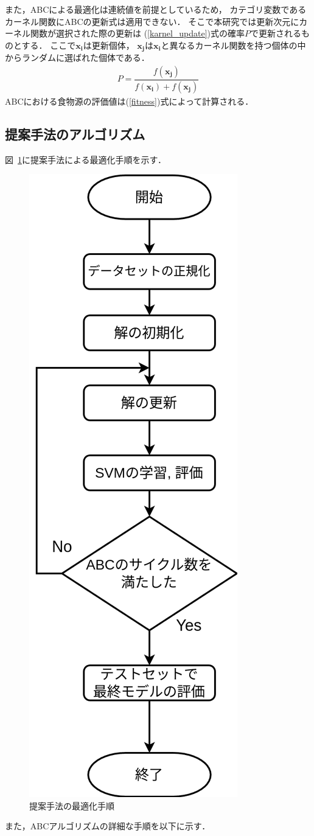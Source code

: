また，ABCによる最適化は連続値を前提としているため，
カテゴリ変数であるカーネル関数にABCの更新式は適用できない．
そこで本研究では更新次元にカーネル関数が選択された際の更新は
(\ref{karnel_update})式の確率$P$で更新されるものとする．
ここで$\boldsymbol{x_i}$は更新個体，
$\boldsymbol{x_j}$は$\boldsymbol{x_i}$と異なるカーネル関数を持つ個体の中からランダムに選ばれた個体である．
\begin{align}
    \label{karnel_update}
   P = \dfrac{f(\boldsymbol{x_j})}{f(\boldsymbol{x_i})+f(\boldsymbol{x_j})}
\end{align}
ABCにおける食物源の評価値は(\ref{fitness})式によって計算される．
\subsection{提案手法のアルゴリズム}
図~\ref{flowchart}に提案手法による最適化手順を示す．
\begin{figure}
    \centering
    \includegraphics[width=0.4\linewidth]{flowchart.png}
    \caption{提案手法の最適化手順} 
    \label{flowchart}
\end{figure}
また，ABCアルゴリズムの詳細な手順を以下に示す．
